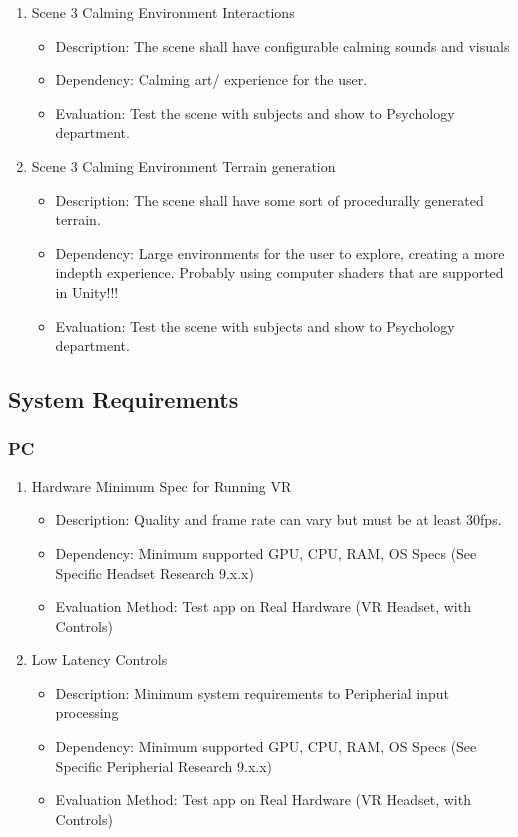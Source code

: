 \documentclass[a4paper,10pt]{article}
\begin{document}
\begin{enumerate}
		\item Scene 3 Calming Environment Interactions 
		\begin{itemize}
		\item Description: The scene shall have configurable calming sounds and visuals
		\item Dependency: Calming art/ experience for the user.
		\item Evaluation: Test the scene with subjects and show to Psychology department. 
		\end{itemize}
		
		\item Scene 3 Calming Environment Terrain generation
		\begin{itemize}
		\item Description: The scene shall have some sort of procedurally generated terrain. 
		\item Dependency: Large environments for the user to explore, creating a more indepth experience. Probably using computer shaders that are supported in Unity!!!
		\item Evaluation: Test the scene with subjects and show to Psychology department. 
		\end{itemize}
		
	\end{enumerate}

	\subsection{System Requirements}
	\subsubsection{PC}
		\begin{enumerate}
			\item Hardware Minimum Spec for Running VR
			\begin{itemize}
				\item Description: Quality and frame rate can vary but must be at least 30fps.
				\item Dependency: Minimum supported GPU, CPU, RAM, OS Specs (See Specific Headset Research 9.x.x) 
				\item Evaluation Method: Test app on Real Hardware (VR Headset, with Controls)
			\end{itemize}
			\item Low Latency Controls
			\begin{itemize}
				\item Description: Minimum system requirements to Peripherial input processing
				\item Dependency: Minimum supported GPU, CPU, RAM, OS Specs (See Specific Peripherial Research 9.x.x) 
				\item Evaluation Method: Test app on Real Hardware (VR Headset, with Controls)
			\end{itemize}
		\end{enumerate}
\end{document}
